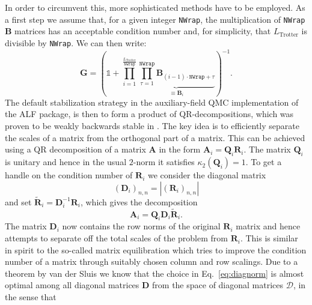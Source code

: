 In order to circumvent this, more sophisticated methods have to be employed. As a first step we assume that, for a given integer \texttt{NWrap}, the multiplication of \texttt{NWrap} $\bm{B}$ matrices has an acceptable condition number and, for simplicity, that $L_{\text{Trotter}}$ is divisible by \texttt{NWrap}. We can then write:
\begin{equation}
\bm{G} = \left( \mathds{1} + \prod\limits_{ i = 1}^{\frac{L_{\text{Trotter}}} {\texttt{NWrap}}}       \underbrace{\prod_{\tau=1}^{\texttt{NWrap}} \bm{B}_{(i-1)  \cdot  \texttt{NWrap}+ \tau} }_{ \equiv \mathcal{\bm{B}}_i}\right)^{-1}.
\end{equation}
The default stabilization strategy in the auxiliary-field QMC implementation of the ALF package, is then to form a product of QR-decompositions, which was proven to be weakly backwards stable in \cite{Bai2011}.
The key idea is to efficiently separate the scales of a matrix from the orthogonal part of a matrix.
This can be achieved using a QR decomposition of a matrix $\bm{A}$ in the form $\bm{A}_i = \bm{Q}_i \bm{R}_i$. The matrix $\bm{Q}_i$ is unitary and hence in the usual $2$-norm it satisfies $\kappa_2(\bm{Q}_i) = 1$.
To get a handle on the condition number of $\bm{R}_i$ we consider the
diagonal matrix
\begin{equation}
(\bm{D}_i)_{n,n} = |(\bm{R}_i)_{n,n}|
\label{eq:diagnorm}
\end{equation}
and set $\tilde{\bm{R}}_i = \bm{D}_i^{-1} \bm{R}_i$, which gives the decomposition
\begin{equation}
\bm{A}_i = \bm{Q}_i \bm{D}_i \tilde{\bm{R}}_i.
\end{equation}
The matrix $\bm{D}_i$ now contains the row norms of the original $\bm{R}_i$ matrix and hence attempts to separate off the total scales of the problem from $\bm{R}_i$.
This is similar in spirit to the so-called matrix equilibration which tries to improve the condition number of a matrix through suitably chosen column and row scalings.
Due to a theorem by van der Sluis \cite{vanderSluis1969} we know that the choice in Eq.~\eqref{eq:diagnorm} is almost optimal among all diagonal matrices $\bm{D}$ from the space of diagonal matrices $\mathcal{D}$, in the sense that
